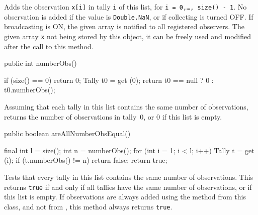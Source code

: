 \begin{tabb}   Adds the observation \texttt{x[i]} in
 tally \texttt{i} of this list, for \texttt{i = 0,\ldots, size() - 1}.
 No observation is added if the value is \texttt{Double.NaN},
 or if collecting is turned OFF.
 If broadcasting is ON, the given array is notified
 to all registered observers.
 The given array \texttt{x} not being stored by this object,
 it can be freely used and modified after the call to this method.
\end{tabb}
\begin{htmlonly}
\end{htmlonly}
\begin{code}

   public int numberObs()\begin{hide} {
      if (size() == 0)
         return 0;
      Tally t0 = get (0);
      return t0 == null ? 0 : t0.numberObs();
   }\end{hide}
\end{code}
\begin{tabb}   Assuming that each tally in this list contains
 the same number of observations, returns
 the number of observations in tally~0, or
  0 if this list is empty.
\end{tabb}
\begin{htmlonly}
\end{htmlonly}
\begin{code}

   public boolean areAllNumberObsEqual()\begin{hide} {
      final int l = size();
      int n = numberObs();
      for (int i = 1; i < l; i++) {
         Tally t = get (i);
         if (t.numberObs() != n)
            return false;
      }
      return true;
   }\end{hide}
\end{code}
\begin{tabb}   Tests that every tally in this list contains the
 same number of observations.
 This returns \texttt{true} if and only if all
 tallies have the same number of observations, or if this list is empty.
 If observations are always added using the
  method from this class, and not
  from
   , this method always  returns \texttt{true}.
\end{tabb}
